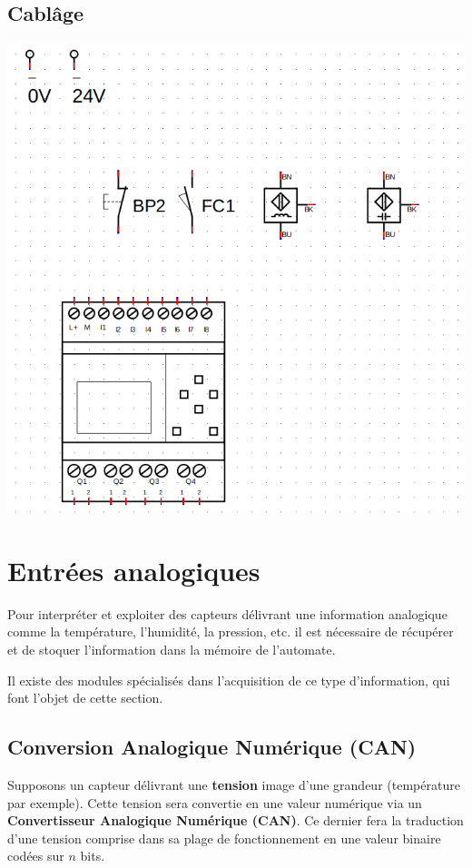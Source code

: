 \documentclass[11pt]{article}
\begin{document}
\subsection{Cablâge}
\begin{UPSTIactivite}
	\begin{center}
		\includegraphics[width=.6\textwidth]{images/C04-aCompleter.png}
	\end{center}
\end{UPSTIactivite}

\section{Entrées analogiques}
Pour interpréter et exploiter des capteurs délivrant une information analogique comme la température, l'humidité, la pression, etc. il est nécessaire de récupérer et de stoquer l'information dans la mémoire de l'automate. 

Il existe des modules spécialisés dans l'acquisition de ce type d'information, qui font l'objet de cette section. 

\subsection{Conversion Analogique Numérique (CAN)}
Supposons un capteur délivrant une \textbf{tension} image d'une grandeur (température par exemple). Cette tension sera convertie en une valeur numérique via un \textbf{Convertisseur Analogique Numérique (CAN)}. Ce dernier fera la traduction d'une tension comprise dans sa plage de fonctionnement en une valeur binaire codées sur $n$ bits. 

\end{document}

